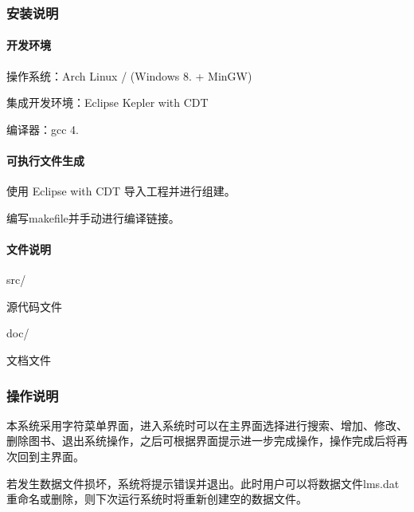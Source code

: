 \subsubsection*{安装说明}

\paragraph*{开发环境}


\begin{DoxyItemize}
\item 操作系统：\-Arch Linux / (Windows 8. + Min\-G\-W)
\item 集成开发环境：\-Eclipse Kepler with C\-D\-T
\item 编译器：gcc 4.
\end{DoxyItemize}

\paragraph*{可执行文件生成}


\begin{DoxyItemize}
\item 使用 Eclipse with C\-D\-T 导入工程并进行组建。
\item 编写{\ttfamily makefile}并手动进行编译链接。
\end{DoxyItemize}

\paragraph*{文件说明}


\begin{DoxyItemize}
\item src/

源代码文件
\item doc/

文档文件
\end{DoxyItemize}

\subsubsection*{操作说明}

本系统采用字符菜单界面，进入系统时可以在主界面选择进行搜索、增加、修改、删除图书、退出系统操作，之后可根据界面提示进一步完成操作，操作完成后将再次回到主界面。

若发生数据文件损坏，系统将提示错误并退出。此时用户可以将数据文件{\ttfamily lms.\-dat}重命名或删除，则下次运行系统时将重新创建空的数据文件。

